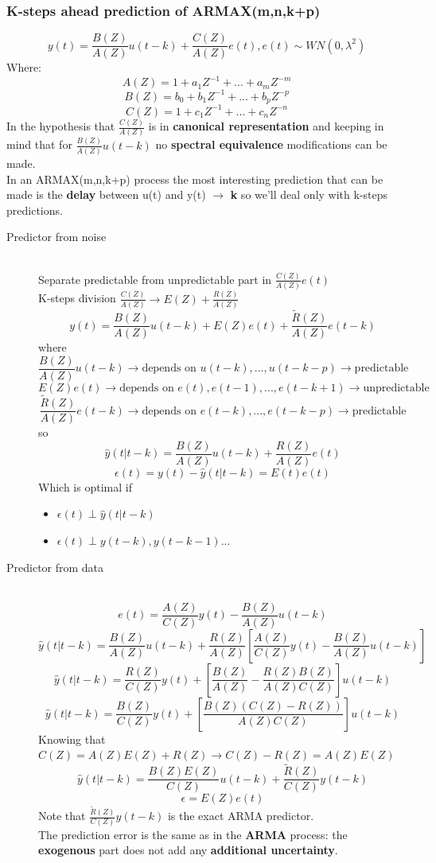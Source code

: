 \subsubsection{K-steps ahead prediction of ARMAX(m,n,k+p)}
$$ y(t) = \frac{B(Z)}{A(Z)}u(t-k) + \frac{C(Z)}{A(Z)}e(t) ,e(t) \sim WN(0,\lambda^2)$$
Where:
$$ A(Z)=1+a_1Z^{-1}+...+a_mZ^{-m}$$
$$ B(Z)=b_0 + b_1Z^{-1}+...+b_pZ^{-p}$$
$$ C(Z)=1+c_1Z^{-1}+...+c_nZ^{-n}$$
In the hypothesis that $\frac{C(Z)}{A(Z)}$ is in \textbf{canonical representation} and keeping in mind that for $\frac{B(Z)}{A(Z)}u(t-k)$ no \textbf{spectral equivalence} modifications can be made.\\
In an ARMAX(m,n,k+p) process the most interesting prediction that can be made is the \textbf{delay} between u(t) and y(t) $\to$ \textbf{k} so we'll deal only with k-steps predictions.
\begin{description}
\item[Predictor from noise]\hfill\\
Separate predictable from unpredictable part in $\frac{C(Z)}{A(Z)}e(t)$\\
K-steps division $\frac{C(Z)}{A(Z)} \to E(Z)+\frac{R(Z)}{A(Z)}$
$$ y(t) = \frac{B(Z)}{A(Z)}u(t-k) + E(Z)e(t) + \frac{\tilde{R}(Z)}{A(Z)}e(t-k)$$
where 
$$\frac{B(Z)}{A(Z)}u(t-k) \to \text{depends on } u(t-k),...,u(t-k-p) \to \text{predictable} $$ 
$$ E(Z)e(t) \to \text{depends on } e(t) , e(t-1),...,e(t-k+1) \to \text{unpredictable} $$ 
$$ \frac{\tilde{R}(Z)}{A(Z)}e(t-k) \to \text{depends on } e(t-k),...,e(t-k-p) \to \text{predictable}$$   
so
\[
\boxed{\hat{y}(t|t-k)=\frac{B(Z)}{A(Z)}u(t-k)+\frac{R(Z)}{A(Z)}e(t)}
\]
\[
\boxed{\epsilon(t) = y(t) - \hat{y}(t|t-k) = E(t)e(t)}
\]
Which is optimal if\begin{itemize}
\item $\epsilon(t) \perp \hat{y}(t|t-k)$
\item $\epsilon(t) \perp y(t-k),y(t-k-1)... $
\end{itemize}

\item[Predictor from data]\hfill\\
$$ e(t) = \frac{A(Z)}{C(Z)}y(t) - \frac{B(Z)}{A(Z)}u(t-k)$$
$$ \hat{y}(t|t-k) = \frac{B(Z)}{A(Z)}u(t-k)+ \frac{R(Z)}{A(Z)} [\frac{A(Z)}{C(Z)}y(t)- \frac{B(Z)}{A(Z)}u(t-k)]$$
$$ \hat{y}(t|t-k) = \frac{R(Z)}{C(Z)}y(t) + [\frac{B(Z)}{A(Z)}-\frac{R(Z)B(Z)}{A(Z)C(Z)}]u(t-k)$$
$$ \hat{y}(t|t-k) = \frac{B(Z)}{C(Z)}y(t) + [\frac{B(Z)(C(Z)-R(Z))}{A(Z)C(Z)}]u(t-k)  $$
Knowing that $C(Z)= A(Z)E(Z)+R(Z) \to C(Z)-R(Z)= A(Z)E(Z)$
\[
\boxed{\hat{y}(t|t-k)=\frac{B(Z)E(Z)}{C(Z)}u(t-k) + \frac{\tilde{R}(Z)}{C(Z)}y(t-k)}
\]
\[
\boxed{\epsilon=E(Z)e(t)}
\]
Note that $\frac{\tilde{R}(Z)}{C(Z)}y(t-k) $ is the exact ARMA predictor.\\
The prediction error is the same as in the \textbf{ARMA} process: the \textbf{exogenous} part does not add any \textbf{additional uncertainty}.


\end{description}
